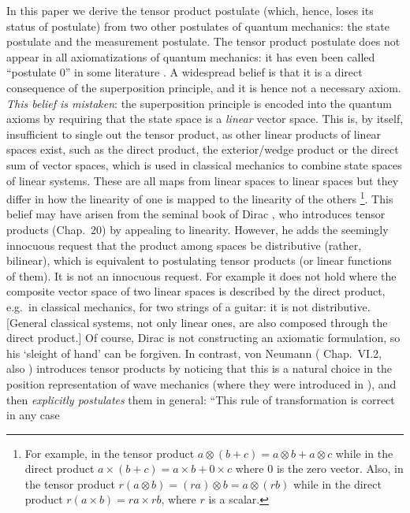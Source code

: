 \documentclass[aps,prl,amsmath,amssymb,twocolumn]{revtex4}
\theoremstyle{plain}
\theoremstyle{definition}
\theoremstyle{remark}
\begin{document}
	In this paper we derive the tensor product postulate (which, hence,
	loses its status of postulate) from two other postulates of quantum
	mechanics: the state postulate and the measurement postulate.  The
	tensor product postulate does not appear in all axiomatizations of
	quantum mechanics: it has even been called ``postulate 0'' in some
	literature \cite{zurek}. A widespread belief is that it is a direct
	consequence of the superposition principle, and it is hence not a
	necessary axiom. {\em This belief is mistaken}: the superposition
	principle is encoded into the quantum axioms by requiring that the
	state space is a {\em linear} vector space. This is, by itself,
	insufficient to single out the tensor product, as other linear
	products of linear spaces exist, such as the direct product, the
	exterior/wedge product or the direct sum of vector spaces, which is
	used in classical mechanics to combine state spaces of linear systems.
	These are all maps from linear spaces to linear spaces but they differ
	in how the linearity of one is mapped to the linearity of the others
	\footnote{For example, in the tensor product
		$a \otimes (b+c) = a \otimes b + a \otimes c$ while in the direct
		product $a \times (b+c) = a \times b + 0 \times c$ where $0$ is the
		zero vector. Also, in the tensor product
		$r (a \otimes b) = (r a) \otimes b = a \otimes (r b)$ while in the
		direct product $r (a \times b) = r a \times r b$, where $r$ is a
		scalar.}.  This belief may have arisen from the seminal book of
	Dirac \cite{diracbook}, who introduces tensor products (Chap.~20) by
	appealing to linearity. However, he adds the seemingly innocuous
	request that the product among spaces be distributive (rather,
	bilinear), which is equivalent to postulating tensor products (or
	linear functions of them). It is not an innocuous request. For example
	it does not hold where the composite vector space of two linear spaces
	is described by the direct product, e.g.~in classical mechanics, for
	two strings of a guitar: it is not distributive.  [General classical
	systems, not only linear ones, are also composed through the direct
	product.] Of course, Dirac is not constructing an axiomatic
	formulation, so his `sleight of hand' can be forgiven. In contrast,
	von Neumann (\cite{vonneumannbook} Chap.~VI.2, also \cite{jauch})
	introduces tensor products by noticing that this is a natural choice
	in the position representation of wave mechanics (where they were
	introduced in \cite{weyl,epr}), and then {\em explicitly postulates}
	them in general: ``This rule of transformation is correct in any case
\end{document}
